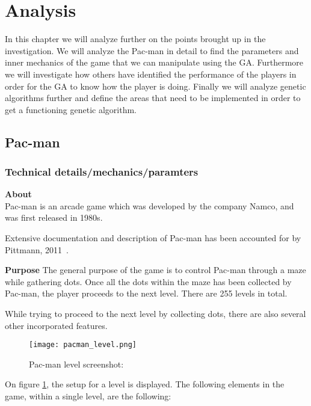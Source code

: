 
\section{Analysis} \label{sec:analysis}
In this chapter we will analyze further on the points brought up in the investigation. 
We will analyze the Pac-man in detail to find the parameters and inner mechanics of the game that we can manipulate using the GA.
Furthermore we will investigate how others have identified the performance of the players in order for the GA to know how the player is doing.
Finally we will analyze genetic algorithms further and define the areas that need to be implemented in order to get a functioning genetic algorithm. 



\subsection{Pac-man}\label{ssec:pacmandetail}
\subsubsection{Technical details/mechanics/paramters}

\textbf{About}\\
Pac-man is an arcade game which was developed by the company Namco, and was first released in 1980s.

Extensive documentation and description of Pac-man has been accounted for by Pittmann, 2011~\cite{Pittman2011}.

\textbf{Purpose}
The general purpose of the game is to control Pac-man through a maze while gathering dots. Once all the dots within the maze has been collected by Pac-man, the player proceeds to the next level. There are 255 levels in total.

While trying to proceed to the next level by collecting dots, there are also several other incorporated features.

\begin{figure}[!htbp]
\centering
\texttt{[image: pacman\_level.png]}
\caption{Pac-man level screenshot: \cite{Pittman2011} }
\label{fig:Pac-man}
\end{figure}


On figure \ref{fig:Pac-man}, the setup for a level is displayed. The following elements in the game, within a single level, are the following:

